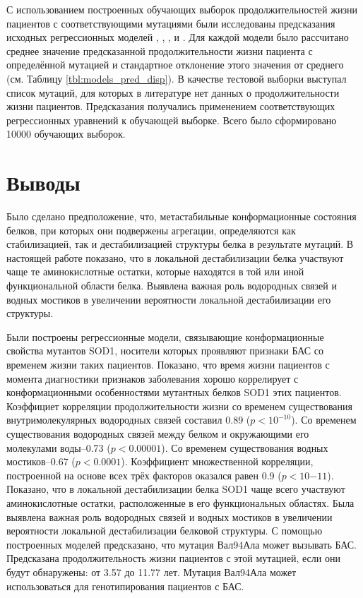 С использованием построенных обучающих выборок продолжительностей жизни пациентов с соответствующими мутациями были исследованы предсказания исходных регрессионных моделей \modelpphb{}, \modelpwhb{}, \modelwbr{}, \modelCLS{} и \modelCRF{}. Для каждой модели было рассчитано среднее значение предсказанной продолжительности жизни пациента с определённой мутацией и стандартное отклонение этого значения от среднего (см. Таблицу \ref{tbl:models_pred_disp}). В качестве тестовой выборки выступал список мутаций, для которых в литературе нет данных о продолжительности жизни пациентов. Предсказания получались применением соответствующих регрессионных уравнений к обучающей выборке. Всего было сформировано 10000 обучающих выборок.

\section{Выводы} \label{sect_MD_implications}

Было сделано предположение, что, метастабильные конформационные состояния белков, при которых они подвержены агрегации, определяются как стабилизацией, так и дестабилизацией структуры белка в результате мутаций. В настоящей работе показано, что в локальной дестабилизации белка участвуют чаще те аминокислотные остатки, которые находятся в той или иной функциональной области белка. Выявлена важная роль водородных связей и водных мостиков в увеличении вероятности локальной дестабилизации его структуры. 

Были построены регрессионные модели, связывающие конформационные свойства мутантов SOD1, носители которых проявляют признаки БАС со временем жизни таких пациентов. Показано, что время жизни пациентов с момента диагностики признаков заболевания хорошо коррелирует с конформационными особенностями мутантных белков SOD1 этих пациентов. Коэффициет корреляции продолжительности жизни со временем существования внутримолекулярных водородных связей составил 0.89 ($p<10^{-10}$). Со временем существования водородных связей между белком и окружающими его молекулами воды--0.73 ($p<0.00001$). Со временем существования водных мостиков--0.67 ($p<0.0001$). Коэффициент множественной корреляции, построенной на основе всех трёх факторов оказался равен 0.9 ($p<10{-11}$). Показано, что в локальной дестабилизации белка SOD1 чаще всего участвуют аминокислотные остатки, расположенные в его функциональных областях. Была выявлена важная роль водородных связей и водных мостиков в увеличении вероятности локальной дестабилизации белковой структуры. С помощью построенных моделей предсказано, что мутация Вал94Ала может вызывать БАС. Предсказана продолжительность жизни пациентов с этой мутацией, если они будут обнаружены: от 3.57 до 11.77 лет. Мутация Вал94Ала может использоваться для генотипирования пациентов с БАС.


